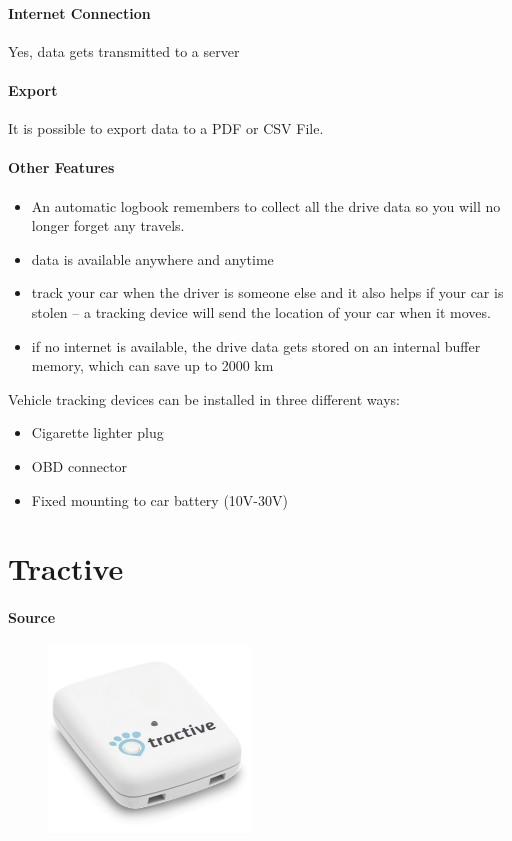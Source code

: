 \paragraph{Internet Connection}Yes, data gets transmitted to a server
\paragraph{Export}It is  possible to export data to a PDF or CSV File.
\paragraph{Other Features}
\begin{itemize}
\item An automatic logbook remembers to collect all the drive data so you will no longer forget any travels.
\item data is available anywhere and anytime
\item track your car when the driver is someone else and it also helps if your car is stolen – a tracking device will send the location of your car when it moves.
\item if no internet is available, the drive data gets stored on an internal buffer memory, which can save up to 2000 km
\end{itemize}
Vehicle tracking devices can be installed in three different ways:
\begin{itemize}
\item Cigarette lighter plug
\item OBD connector
\item Fixed mounting to car battery (10V-30V)
\end{itemize}
\newpage

\section{Tractive}
\paragraph{Source} 
\begin{figure}
  \begin{center}
    \includegraphics[width=0.48\textwidth]{tractive}
  \end{center}
\end{figure}
